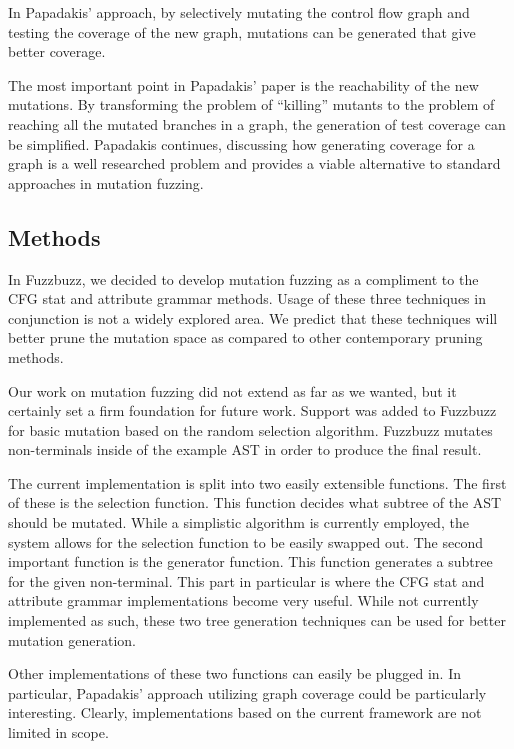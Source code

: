 In Papadakis' approach, by selectively mutating the control flow graph
and testing the coverage of the new graph, mutations can be generated
that give better coverage.

The most important point in Papadakis' paper is the reachability of
the new mutations. By transforming the problem of ``killing'' mutants
to the problem of reaching all the mutated branches in a graph, the
generation of test coverage can be simplified. Papadakis continues,
discussing how generating coverage for a graph is a well researched
problem and provides a viable alternative to standard approaches in
mutation fuzzing.







\subsection{Methods}

In Fuzzbuzz, we decided to develop mutation fuzzing as a compliment to
the CFG stat and attribute grammar methods. Usage of these three
techniques in conjunction is not a widely explored area. We predict
that these techniques will better prune the mutation space as compared
to other contemporary pruning methods.

Our work on mutation fuzzing did not extend as far as we wanted, but
it certainly set a firm foundation for future work. Support was added
to Fuzzbuzz for basic mutation based on the random selection
algorithm. Fuzzbuzz mutates non-terminals inside of the example AST in
order to produce the final result.

The current implementation is split into two easily extensible
functions. The first of these is the selection function. This function
decides what subtree of the AST should be mutated. While a simplistic
algorithm is currently employed, the system allows for the selection
function to be easily swapped out. The second important function is
the generator function. This function generates a subtree for the
given non-terminal. This part in particular is where the CFG stat and
attribute grammar implementations become very useful. While not
currently implemented as such, these two tree generation techniques
can be used for better mutation generation.

Other implementations of these two functions can easily be plugged
in. In particular, Papadakis' approach utilizing graph coverage could
be particularly interesting. Clearly, implementations based on the
current framework are not limited in scope.
